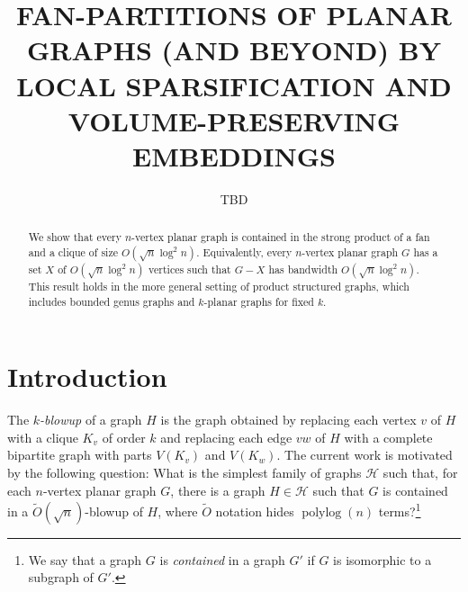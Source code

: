\documentclass{patmorin}
\title{\MakeUppercase{Fan-Partitions of Planar Graphs (and Beyond)
  \newline by Local Sparsification and Volume-Preserving Embeddings}}
\author{TBD}
\date{}
\newcommand{\david}[1]{{\color{orange} David: #1}}
\newcommand{\pat}[1]{\textcolor{Blue}{Pat: #1}}
\newcommand{\defin}[1]{\emph{\textcolor{brightmaroon}{#1}}}
\DeclareMathOperator{\polylog}{polylog}
\begin{document}
\maketitle

\begin{abstract}
  We show that every $n$-vertex planar graph is contained in the strong product of a fan and a clique of size $O(\sqrt{n}\log^2 n)$.  Equivalently, every $n$-vertex planar graph $G$ has a set $X$ of $O(\sqrt{n}\log^2 n)$ vertices such that $G-X$ has bandwidth $O(\sqrt{n}\log^2 n)$.  This result holds in the more general setting of product structured graphs, which includes bounded genus graphs and $k$-planar graphs for fixed $k$.
\end{abstract}

\section{Introduction}

%

The \defin{$k$-blowup} of a graph $H$ is the graph obtained by replacing each vertex $v$ of $H$ with a clique $K_v$ of order $k$ and replacing each edge $vw$ of $H$ with a complete bipartite graph with parts $V(K_v)$ and $V(K_w)$.  The current work is motivated by the following question: What is the simplest family of graphs $\mathcal{H}$ such that, for each $n$-vertex planar graph $G$, there is a graph $H\in\mathcal{H}$ such that $G$ is contained in a $\tilde{O}(\sqrt{n})$-blowup of $H$, where $\tilde{O}$ notation hides $\polylog(n)$ terms?\footnote{We say that a graph $G$ is \defin{contained} in a graph $G'$ if $G$ is isomorphic to a subgraph of $G'$.}
\end{document}
